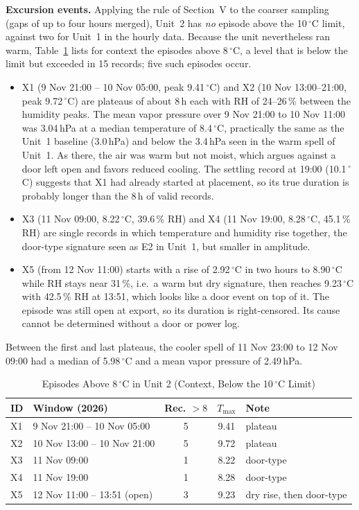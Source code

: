 \documentclass[conference]{IEEEtran}
\newcommand{\degC}{\ensuremath{^{\circ}}C}
\newcommand{\Tmax}{\ensuremath{T_{\max}}}
\begin{document}
\textbf{Excursion events.} Applying the rule of Section~V to the coarser sampling (gaps of up to four hours merged), Unit~2 has \emph{no} episode above the 10\,\degC{} limit, against two for Unit~1 in the hourly data. Because the unit nevertheless ran warm, Table~\ref{tab:x} lists for context the episodes above 8\,\degC{}, a level that is below the limit but exceeded in 15 records; five such episodes occur.
\begin{itemize}
\item X1 (9 Nov 21:00 -- 10 Nov 05:00, peak 9.41\,\degC) and X2 (10 Nov 13:00--21:00, peak 9.72\,\degC) are plateaus of about 8\,h each with RH of 24--26\,\% between the humidity peaks. The mean vapor pressure over 9 Nov 21:00 to 10 Nov 11:00 was 3.04\,hPa at a median temperature of 8.4\,\degC, practically the same as the Unit~1 baseline (3.0\,hPa) and below the 3.4\,hPa seen in the warm spell of Unit~1. As there, the air was warm but not moist, which argues against a door left open and favors reduced cooling. The settling record at 19:00 (10.1\,\degC) suggests that X1 had already started at placement, so its true duration is probably longer than the 8\,h of valid records.
\item X3 (11 Nov 09:00, 8.22\,\degC, 39.6\,\% RH) and X4 (11 Nov 19:00, 8.28\,\degC, 45.1\,\% RH) are single records in which temperature and humidity rise together, the door-type signature seen as E2 in Unit~1, but smaller in amplitude.
\item X5 (from 12 Nov 11:00) starts with a rise of 2.92\,\degC{} in two hours to 8.90\,\degC{} while RH stays near 31\,\%, i.e.\ a warm but dry signature, then reaches 9.23\,\degC{} with 42.5\,\% RH at 13:51, which looks like a door event on top of it. The episode was still open at export, so its duration is right-censored. Its cause cannot be determined without a door or power log.
\end{itemize}
Between the first and last plateaus, the cooler spell of 11 Nov 23:00 to 12 Nov 09:00 had a median of 5.98\,\degC{} and a mean vapor pressure of 2.49\,hPa.

\begin{table}[t]
\caption{Episodes Above 8\,\degC{} in Unit 2 (Context, Below the 10\,\degC{} Limit)}
\label{tab:x}
\centering
\footnotesize
\setlength{\tabcolsep}{2.5pt}
\begin{tabular}{llccl}
\toprule
ID & Window (2026) & Rec. $>8$ & \Tmax & Note \\
\midrule
X1 & 9 Nov 21:00 -- 10 Nov 05:00 & 5 & 9.41 & plateau \\
X2 & 10 Nov 13:00 -- 10 Nov 21:00 & 5 & 9.72 & plateau \\
X3 & 11 Nov 09:00 & 1 & 8.22 & door-type \\
X4 & 11 Nov 19:00 & 1 & 8.28 & door-type \\
X5 & 12 Nov 11:00 -- 13:51 (open) & 3 & 9.23 & dry rise, then door-type \\
\bottomrule
\end{tabular}
\end{table}
\end{document}
